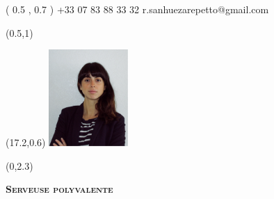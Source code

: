 \documentclass[30pt, french]{tccv}
\begin{document}
\begin{upshape}
\fontsize{9pt}{1em}\color{text}\selectfont



%
%




\begin{textblock}{6.5}( 0.5 , 0.7 )
    {+33 07 83 88 33 32}
    {r.sanhuezarepetto@gmail.com}
\end{textblock}

\begin{textblock}{21}(0.5,1)
\end{textblock}

\begin{textblock}{21}(17.2,0.6)
		\includegraphics[width=3cm]{../Figure/Rocio3.png}
\end{textblock}  



\begin{textblock}{21}(0,2.3)

\begin{center}
	{\fontsize{20pt}{5em}\scshape\bfseries Serveuse polyvalente \\} 

	\vspace{5pt}
	
	{\fontsize{15pt}{3.5em}\color{text}\bodyfontlight\upshape \\}
\end{center}
\end{textblock}  






\end{upshape}
\end{document}
